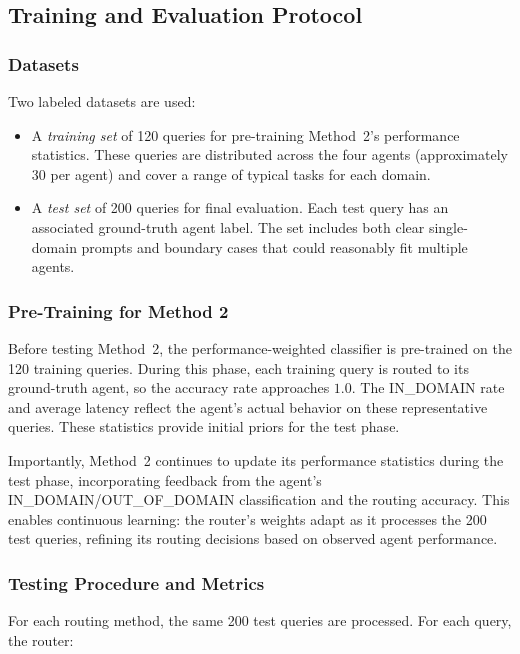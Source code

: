 \documentclass[11pt]{article}
\begin{document}
\subsection{Training and Evaluation Protocol}

\subsubsection{Datasets}

Two labeled datasets are used:

\begin{itemize}
    \item A \emph{training set} of 120 queries for pre-training Method~2's performance statistics. These queries are distributed across the four agents (approximately 30 per agent) and cover a range of typical tasks for each domain.
    \item A \emph{test set} of 200 queries for final evaluation. Each test query has an associated ground-truth agent label. The set includes both clear single-domain prompts and boundary cases that could reasonably fit multiple agents.
\end{itemize}

\subsubsection{Pre-Training for Method 2}

Before testing Method~2, the performance-weighted classifier is pre-trained on the 120 training queries. During this phase, each training query is routed to its ground-truth agent, so the accuracy rate approaches $1.0$. The IN\_DOMAIN rate and average latency reflect the agent's actual behavior on these representative queries. These statistics provide initial priors for the test phase.

Importantly, Method~2 continues to update its performance statistics during the test phase, incorporating feedback from the agent's IN\_DOMAIN/OUT\_OF\_DOMAIN classification and the routing accuracy. This enables continuous learning: the router's weights adapt as it processes the 200 test queries, refining its routing decisions based on observed agent performance.

\subsubsection{Testing Procedure and Metrics}

For each routing method, the same 200 test queries are processed. For each query, the router:
\end{document}
